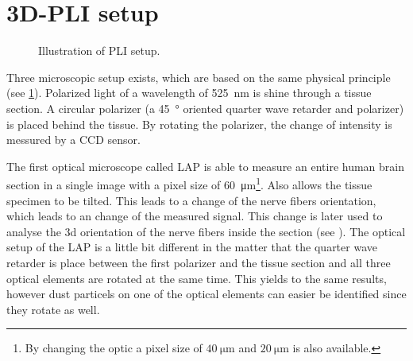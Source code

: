 \section{3D-PLI setup}\label{sec:expSetup}
%
\begin{figure}[!t]
    \captionsetup[sub]{position=top}
    \setlength{\tikzwidth}{\textwidth}
	\centering
	\caption{Illustration of PLI setup.}
	\label{fig:pli_setup}
\end{figure}
%
%
Three microscopic setup exists, which are based on the same physical principle \cite{Axer2011} (see \cref{fig:pli_setup}).
Polarized light of a wavelength of \SI{525}{\nano\meter} is shine through a tissue section. A circular polarizer (a \SI{45}{\degree} oriented quarter wave retarder and polarizer) is placed behind the tissue.
By rotating the polarizer, the change of intensity is messured by a \ac{CCD} sensor.
\par
% 
The first optical microscope called \ac{LAP} is able to measure an entire human brain section in a single image with a pixel size of \SI{60}{\micro\meter}\footnote{By changing the optic a pixel size of $\SI{40}{\micro\meter}$ and $\SI{20}{\micro\meter}$ is also available.}.
Also allows the tissue specimen to be tilted.
This leads to a change of the nerve fibers orientation, which leads to an change of the measured signal.
This change is later used to analyse the 3d orientation of the nerve fibers inside the section (see \dummy{}).
The optical setup of the \ac{LAP} is a little bit different in the matter that the quarter wave retarder is place between the first polarizer and the tissue section and all three optical elements are rotated at the same time.
This yields to the same results, however dust particels on one of the optical elements can easier be identified since they rotate as well.
